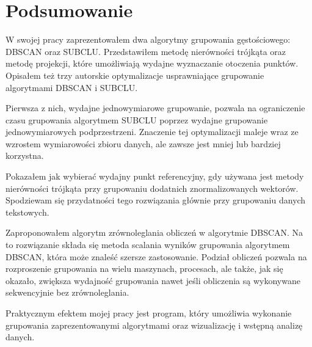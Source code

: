 \chapter{Podsumowanie}
W swojej pracy zaprezentowałem dwa algorytmy grupowania gęstościowego: DBSCAN oraz SUBCLU. Przedstawiłem metodę nierówności trójkąta oraz metodę projekcji, które umożliwiają wydajne wyznaczanie otoczenia punktów. Opisałem też trzy autorskie optymalizacje usprawniające grupowanie algorytmami DBSCAN i SUBCLU. 

Pierwsza z nich, wydajne jednowymiarowe grupowanie, pozwala na ograniczenie czasu grupowania algorytmem SUBCLU poprzez wydajne grupowanie jednowymiarowych podprzestrzeni. Znaczenie tej optymalizacji maleje wraz ze wzrostem wymiarowości zbioru danych, ale zawsze jest mniej lub bardziej korzystna.

Pokazałem jak wybierać wydajny punkt referencyjny, gdy używana jest metody nierówności trójkąta przy grupowaniu dodatnich znormalizowanych wektorów. Spodziewam się przydatności tego rozwiązania głównie przy grupowaniu danych tekstowych.

Zaproponowałem algorytm zrównoleglania obliczeń w algorytmie DBSCAN. Na to rozwiązanie składa się metoda scalania wyników grupowania algorytmem DBSCAN, która może znaleść szersze zastosowanie. Podział obliczeń pozwala na rozproszenie grupowania na wielu maszynach, procesach, ale także, jak się okazało, zwiększa wydajność grupowania nawet jeśli obliczenia są wykonywane sekwencyjnie bez zrównoleglania.

Praktycznym efektem mojej pracy jest program, który umożliwia wykonanie grupowania zaprezentowanymi algorytmami oraz wizualizację i wstępną analizę danych.